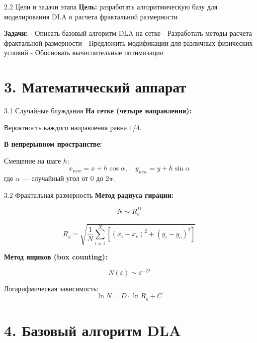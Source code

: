 \documentclass[
  ignorenonframetext,
  aspectratio=169,
  russian,
]{beamer}
\begin{document}
\begin{frame}{2.2 Цели и задачи этапа}
\label{ux446ux435ux43bux438-ux438-ux437ux430ux434ux430ux447ux438-ux44dux442ux430ux43fux430}
\textbf{Цель:} разработать алгоритмическую базу для моделирования DLA и
расчета фрактальной размерности

\textbf{Задачи:} - Описать базовый алгоритм DLA на сетке - Разработать
методы расчета фрактальной размерности - Предложить модификации для
различных физических условий - Обосновать вычислительные оптимизации
\end{frame}

\section{3. Математический
аппарат}\label{ux43cux430ux442ux435ux43cux430ux442ux438ux447ux435ux441ux43aux438ux439-ux430ux43fux43fux430ux440ux430ux442}

\begin{frame}{3.1 Случайные блуждания}
\label{ux441ux43bux443ux447ux430ux439ux43dux44bux435-ux431ux43bux443ux436ux434ux430ux43dux438ux44f}
\textbf{На сетке (четыре направления):}

Вероятность каждого направления равна \(1/4\).

\textbf{В непрерывном пространстве:}

Смещение на шаге \(h\):
\[x_{new} = x + h \cos\alpha, \quad y_{new} = y + h \sin\alpha\] где
\(\alpha\) --- случайный угол от \(0\) до \(2\pi\).
\end{frame}

\begin{frame}{3.2 Фрактальная размерность}
\label{ux444ux440ux430ux43aux442ux430ux43bux44cux43dux430ux44f-ux440ux430ux437ux43cux435ux440ux43dux43eux441ux442ux44c}
\textbf{Метод радиуса гирации:}

\[N \sim R_g^D\]

\[R_g = \sqrt{\frac{1}{N}\sum_{i=1}^N \left[(x_i-x_c)^2 + (y_i-y_c)^2\right]}\]

\textbf{Метод ящиков (box counting):}

\[N(\varepsilon) \sim \varepsilon^{-D}\]

Логарифмическая зависимость: \[\ln N = D \cdot \ln R_g + C\]
\end{frame}

\section{4. Базовый алгоритм
DLA}\label{ux431ux430ux437ux43eux432ux44bux439-ux430ux43bux433ux43eux440ux438ux442ux43c-dla}
\end{document}
